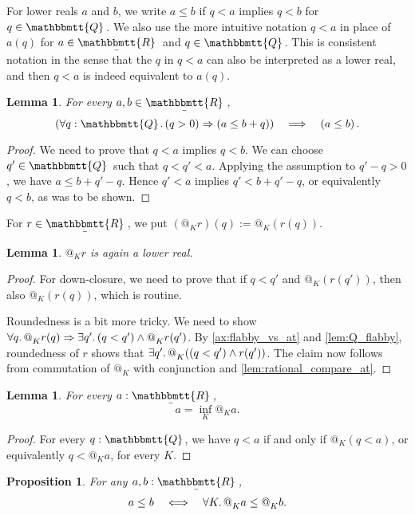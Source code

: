 \documentclass[11pt, oneside, article]{memoir}
\makeatletter
\theoremstyle{plain}
\newtheorem{proposition}[theorem]{Proposition}
\newtheorem{lemma}[theorem]{Lemma}
\theoremstyle{definition}
\theoremstyle{remark}
\newcommand{\ubar}[1]{\underaccent{\bar}{#1}}
\newcommand{\internal}[1]{\raisebox{-.03ex}{$\mathbbmtt{#1}$}}
\newcommand{\hs}{\hspace{1.1pt}}
\newcommand{\tQQ}{\internal{Q}\hs}
\newcommand{\tRR}{\internal{R}\hs}
\newcommand{\tLR}{\ubar{\tRR}\hs}
\newcommand{\AtSymbol}{{@}}
\newcommand{\At}[2][]{\AtSymbol^{#1}_{#2}}
\newcommand{\imp}{\Rightarrow}
\makeatother
\begin{document}
For lower reals $a$ and $b$, we write $a\leq b$ if $q < a$ implies $q < b$ for $q\in\tQQ$. We also use the more intuitive notation $q < a$ in place of $a(q)$ for $a\in\tLR$ and $q\in\tQQ$. This is consistent notation in the sense that the $q$ in $q < a$ can also be interpreted as a lower real, and then $q < a$ is indeed equivalent to $a(q)$.

\begin{lemma}
	For every $a,b\in\tLR$,
	\[
		\left(\forall q : \tQQ\ldotp (q > 0) \imp (a \leq b + q)\right) \quad \Longrightarrow \quad \left( a \leq b \right).
	\]
	\label{lem:eps_order}
\end{lemma}

\begin{proof}
	We need to prove that $q < a$ implies $q < b$. We can choose $q' \in \tQQ$ such that $q < q' < a$. Applying the assumption to $q' - q > 0$, we have $a \leq b + q' - q$. Hence $q' < a$ implies $q' < b + q' - q$, or equivalently $q < b$, as was to be shown.
\end{proof}

For $r\in\tLR$, we put $(\At{K}r)(q) := \At{K}(r(q))$.

\begin{lemma}
	$\At{K}r$ is again a lower real.	
\end{lemma}

\begin{proof}
	For down-closure, we need to prove that if $q < q'$ and $\At{K}(r(q'))$, then also $\At{K}(r(q))$, which is routine.

	Roundedness is a bit more tricky. We need to show $\forall q\ldotp \At{K} r(q) \imp \exists q'\ldotp (q < q') \land \At{K} r(q')$. By \cref{ax:flabby_vs_at} and \cref{lem:Q_flabby}, roundedness of $r$ shows that $\exists q'\ldotp \At{K}((q < q') \land r(q'))$. The claim now follows from commutation of $\At{K}$ with conjunction and \cref{lem:rational_compare_at}.
\end{proof}

\begin{lemma}
	For every $a : \tLR$,
	\[
		a = \inf_K \At{K} a.
	\]
	\label{lem:lower_reals_local}
\end{lemma}

\begin{proof}
	For every $q : \tQQ$, we have $q < a$ if and only if $\At{K}(q < a)$, or equivalently $q < \At{K}a$, for every $K$.
\end{proof}

\begin{proposition}\label{prop:enough_points_LR}
For any $a,b:\tLR$,
\[
	a \leq b \quad \Longleftrightarrow \quad \forall K\ldotp \At{K} a \leq \At{K} b.
\]
\end{proposition}
\end{document}
